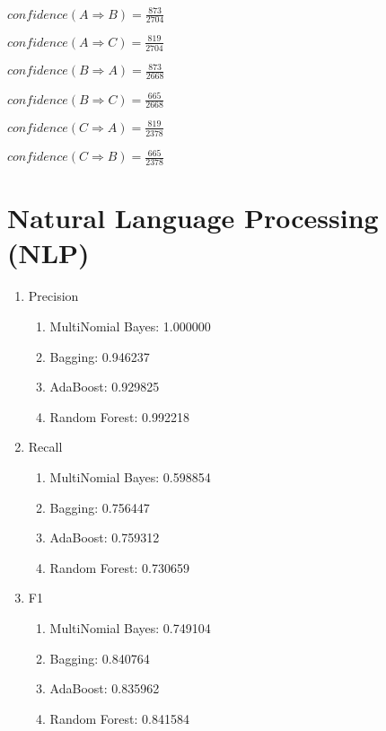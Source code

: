\documentclass[12pt,a4paper]{article}
\begin{document}
\begin{enumerate}[label=(\alph*)]
			$confidence(A \Rightarrow B) =  \frac{873}{2704}$
			
			$confidence(A \Rightarrow C) = \frac{819}{2704}$
			
			$confidence(B \Rightarrow A) = \frac{873}{2668}$
			
			$confidence(B \Rightarrow C) = \frac{665}{2668}$
			
			$confidence(C \Rightarrow A) = \frac{819}{2378}$
			
			$confidence(C \Rightarrow B) = \frac{665}{2378}$
		
	\end{enumerate}

\section{Natural Language Processing (NLP)}
	\begin{enumerate}[label=(\alph*)]
		\item Precision
			\begin{enumerate}[label=\roman*.]
				\item MultiNomial Bayes: 1.000000
				
				\item Bagging: 0.946237
				
				\item AdaBoost: 0.929825
				
				\item Random Forest: 0.992218
				
			\end{enumerate}
		\item Recall
		\begin{enumerate}[label=\roman*.]
				\item MultiNomial Bayes: 0.598854
				
				\item Bagging: 0.756447
				
				\item AdaBoost: 0.759312
				
				\item Random Forest: 0.730659
				
			\end{enumerate}
		\item F1
			\begin{enumerate}[label=\roman*.]
				\item MultiNomial Bayes: 0.749104
				
				\item Bagging: 0.840764
				
				\item AdaBoost: 0.835962
				
				\item Random Forest: 0.841584
				
			\end{enumerate}
	\end{enumerate}
\end{document}
